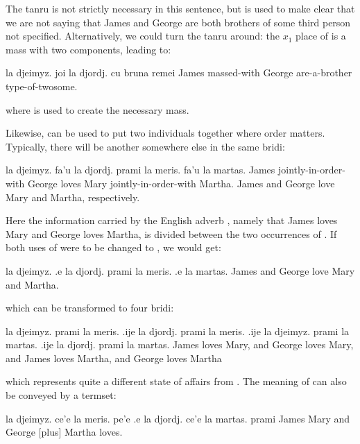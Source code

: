 The tanru  is not strictly necessary in this
    sentence, but is used to make clear that we are not saying that
    James and George are both brothers of some third person not
    specified. Alternatively, we could turn the tanru around: the
    $x_1$ place of  is a mass with two components, leading
    to:
\begin{example}
la djeimyz. joi la djordj.\n
\T	cu bruna remei\n
James massed-with George\n
\T	are-a-brother type-of-twosome.
\end{example}

{\noindent}where  is used to create the necessary mass. 

Likewise,  can be used to put two individuals
    together where order matters. Typically, there will be another
     somewhere else in the same bridi:
\begin{example}
la djeimyz. fa'u la djordj.\n
\T	prami la meris. fa'u la martas.\n
James jointly-in-order-with George\n
\T	loves Mary jointly-in-order-with Martha.\n
James and George love Mary and Martha, respectively.
\end{example}

Here the information carried by the English adverb
    , namely that James loves Mary and George loves
    Martha, is divided between the two occurrences of . If
    both uses of  were to be changed to , we would
    get:
\begin{example}
la djeimyz. .e la djordj.\n
\T	prami la meris. .e la martas.\n
James and George love Mary and Martha.
\end{example}

{\noindent}which can be transformed to four bridi:
\begin{example}
la djeimyz. prami la meris.\n
\T	.ije la djordj. prami la meris.\n
\T	.ije la djeimyz. prami la martas.\n
\T	.ije la djordj. prami la martas.\n
James loves Mary, and George loves Mary,\n
\T	and James loves Martha, and George loves Martha
\end{example}

{\noindent}which represents quite a different state of affairs from . The meaning of  can also be conveyed by a
    termset:
\begin{example}
la djeimyz. ce'e la meris.\n
\T	pe'e .e la djordj. ce'e la martas. prami\n
James  Mary\n
\T	[joint] and George [plus] Martha loves.
\end{example}

